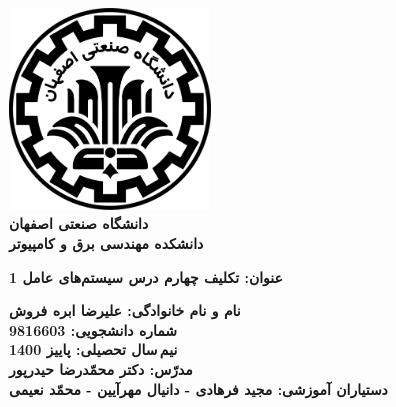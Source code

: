 \begin{titlepage}
\begin{center}
\includegraphics[width=0.4\textwidth]{figures/IUT Logo.png}\\
        
\LARGE
\textbf{دانشگاه صنعتی اصفهان}\\
\textbf{دانشکده مهندسی برق و کامپیوتر}\\
        
\vfill
        
\huge
\textbf{عنوان: تکلیف چهارم درس سیستم‌های عامل 1}\\
        
\vfill
        
\LARGE
\textbf{نام و نام خانوادگی: علیرضا ابره فروش}\\
\textbf{شماره دانشجویی: 9816603}\\
\textbf{نیم\,سال تحصیلی: پاییز 1400}\\
\textbf{مدرّس: دکتر محمّدرضا حیدرپور}\\
\textbf{دستیاران آموزشی: مجید فرهادی - دانیال مهرآیین - محمّد نعیمی}\\
\end{center}
\end{titlepage}
